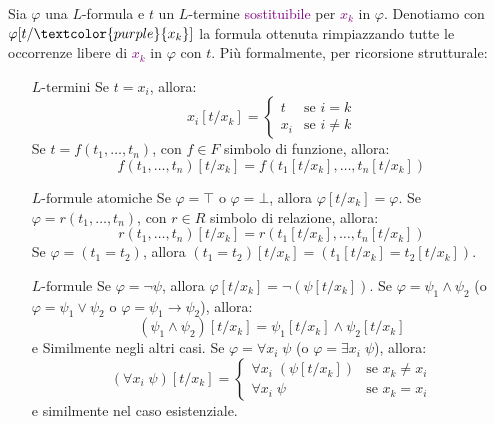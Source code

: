 \begin{definition}
    Sia $\varphi$ una $L$-formula e $t$ un $L$-termine \textcolor{purple}{sostituibile} per \textcolor{purple}{$x_k$} in $\varphi$. Denotiamo con $\varphi[t/\textcolor{purple}{x_k}]$ la formula ottenuta rimpiazzando tutte le
    occorrenze libere di \textcolor{purple}{$x_k$} in $\varphi$ con $t$. Più formalmente, per ricorsione strutturale:
    \begin{itemize}
        \item [$\boxed{\text{$L$-termini}}$] Se $t = x_i$, allora:
        \[ x_i[t/x_k] = \begin{cases}
            t &\text{se $i = k$} \\
            x_i &\text{se $i \neq k$}
        \end{cases}
        \]
        Se $t = f(t_1,\ldots,t_n)$, con $f \in F$ simbolo di funzione, allora:
        \[ f(t_1,\ldots,t_n)[t/x_k] = f(t_1[t/x_k],\ldots,t_n[t/x_k])
        \]
        \item[$\boxed{\text{$L$-formule atomiche}}$] Se $\varphi = \top$ o $\varphi = \bot$, allora $\varphi[t/x_k] = \varphi$. Se $\varphi = r(t_1,\ldots,t_n)$, con $r \in R$ simbolo di relazione, allora:
        \[ r(t_1,\ldots,t_n)[t/x_k] = r(t_1[t/x_k],\ldots,t_n[t/x_k])
        \]
        Se $\varphi = (t_1 = t_2)$, allora $(t_1 = t_2)[t/x_k] = (t_1[t/x_k] = t_2[t/x_k])$.
        \item [$\boxed{\text{$L$-formule}}$] Se $\varphi = \neg \psi$, allora $\varphi[t/x_k] = \neg (\psi[t/x_k])$. Se $\varphi = \psi_1 \land \psi_2$ (o $\varphi = \psi_1 \lor \psi_2$ o $\varphi = \psi_1 \to \psi_2$), allora:
        \[ (\psi_1 \land \psi_2)[t/x_k] = \psi_1[t/x_k] \land \psi_2[t/x_k]
        \]
        e Similmente negli altri casi. Se $\varphi = \forall x_i \; \psi$ (o $\varphi = \exists x_i \; \psi$), allora:
        \[ (\forall x_i \; \psi)[t/x_k] = \begin{cases}
            \forall x_i \; (\psi[t/x_k]) &\text{se $x_k \ne x_i$} \\
            \forall x_i \; \psi &\text{se $x_k = x_i$}
        \end{cases}
        \]
        e similmente nel caso esistenziale.
    \end{itemize}
\end{definition}

